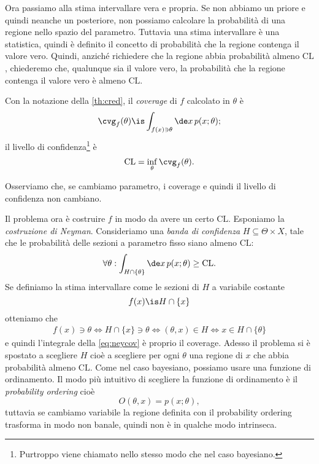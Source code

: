 
Ora passiamo alla stima intervallare vera e propria.
Se non abbiamo un priore e quindi neanche un posteriore,
non possiamo calcolare la probabilità di una regione nello spazio del parametro.
Tuttavia una stima intervallare è una statistica,
quindi è definito il concetto di probabilità che la regione contenga il valore vero.
Quindi, anziché richiedere che la regione abbia probabilità almeno $\mathrm{CL}$,
chiederemo che,
qualunque sia il valore vero,
la probabilità che la regione contenga il valore vero è almeno $\mathrm{CL}$.

\begin{definition}[Coverage]
	Con la notazione della \autoref{th:cred},
	il \emph{coverage} di $f$ calcolato in $\theta$ è
	\begin{equation*}
		\cvg_f(\theta)
		\is \int_{f(x)\ni\theta} \de x\, p(x;\theta);
	\end{equation*}
	il livello di confidenza\footnote{Purtroppo viene chiamato nello stesso modo che nel caso bayesiano.} è
	\begin{equation*}
		\mathrm{CL}
		= \inf_\theta \cvg_f(\theta).
	\end{equation*}
\end{definition}

Osserviamo che,
se cambiamo parametro,
i coverage e quindi il livello di confidenza non cambiano.

Il problema ora è costruire $f$ in modo da avere un certo $\mathrm{CL}$.
Esponiamo la \emph{costruzione di Neyman}.
Consideriamo una \emph{banda di confidenza} $H\subseteq \Theta\times X$,
tale che le probabilità delle sezioni a parametro fisso siano almeno $\mathrm{CL}$:
\begin{equation}
	\label{eq:neycov}
	\forall\theta:
	\int_{H\cap \{\theta\}} \de x\, p(x;\theta) \ge \mathrm{CL}.
\end{equation}
Se definiamo la stima intervallare come le sezioni di $H$ a variabile costante
\begin{equation*}
	f(x) \is H \cap \{x\}
\end{equation*}
otteniamo che
\begin{align*}
	f(x)\ni\theta
	\iff
	H \cap \{x\} \ni \theta
	\iff
	(\theta,x) \in H
	\iff
	x \in H \cap \{\theta\}
\end{align*}
e quindi l'integrale della \eqref{eq:neycov} è proprio il coverage.
Adesso il problema si è spostato a scegliere $H$
cioè a scegliere per ogni $\theta$ una regione di $x$ che abbia probabilità almeno $\mathrm{CL}$.
Come nel caso bayesiano, possiamo usare una funzione di ordinamento.
Il modo più intuitivo di scegliere la funzione di ordinamento è il \emph{probability ordering} cioè
\begin{equation*}
	O(\theta,x) = p(x;\theta),
\end{equation*}
tuttavia se cambiamo variabile la regione definita con il probability ordering trasforma in modo non banale,
quindi non è in qualche modo intrinseca.

